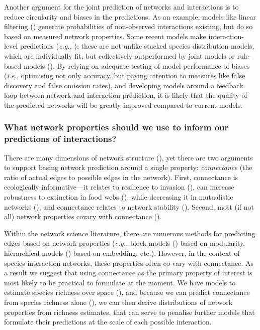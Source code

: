 \begin{refsection}
Another argument for the joint prediction of networks and interactions
is to reduce circularity and biases in the predictions. As an example,
models like linear filtering (\cite{Stock2017LinFil}) generate
probabilities of non-observed interactions existing, but do so based on
measured network properties. Some recent models make interaction-level
predictions (\emph{e.g.,} \cite{Gravel2019Bringing}); these are not unlike stacked
species distribution models, which are individually fit, but
collectively outperformed by joint models or rule-based models
(\cite{Zurell2020TesSpe}). By relying on adequate testing of model
performance of biases (\emph{i.e.,} optimising not only accuracy, but paying
attention to measures like false discovery and false omission rates),
and developing models around a feedback loop between network and
interaction prediction, it is likely that the quality of the predicted
networks will be greatly improved compared to current models.

\subsubsection{What network properties should we use to inform our
predictions of
interactions?}\label{what-network-properties-should-we-use-to-inform-our-predictions-of-interactions}

There are many dimensions of network structure (\cite{Delmas2018Analysing}),
yet there are two arguments to support basing network prediction around
a single property: \emph{connectance} (the ratio of actual edges to
possible edges in the network). First, connectance is ecologically
informative---it relates to resilience to invasion (\cite{Baiser2010ConDet,
Smith-Ramesh2016GloSyn}), can increase robustness to extinction in
food webs (\cite{Dunne2002NetStr}), while decreasing it in mutualistic
networks (\cite{Vieira2015SimSto}), and connectance relates to network
stability (\cite{Landi2018Complexity}). Second, most (if not all) network
properties covary with connectance (\cite{Poisot2014WheEco,
Dunne2002FooStr}).

Within the network science literature, there are numerous methods for
predicting edges based on network properties (\emph{e.g.,} block models
(\cite{Yen2020ComDet}) based on modularity, hierarchical models
(\cite{Kawakatsu2021EmeHie}) based on embedding, etc.). However, in the
context of species interaction networks, these properties often co-vary
with connectance. As a result we suggest that using connectance as the
primary property of interest is most likely to be practical to formulate
at the moment. We have models to estimate species richness over space
(\cite{Jenkins2013GloPat}), and because we can predict connectance from
species richness alone (\cite{MacDonald2020Revisiting}), we can then derive
distributions of network properties from richness estimates, that can
serve to penalise further models that formulate their predictions at the
scale of each possible interaction.


\end{refsection}
